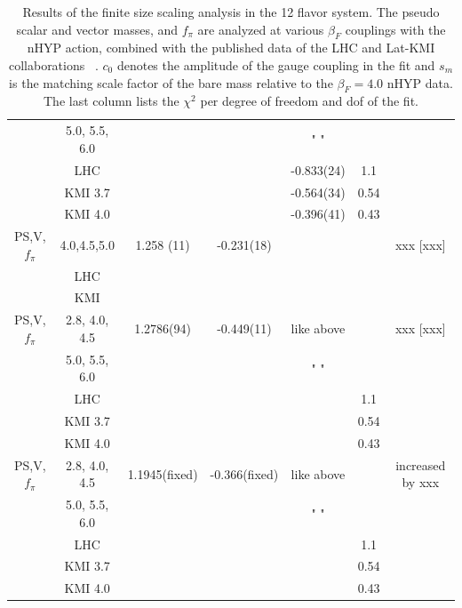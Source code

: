 \documentclass[aps,prl,twocolumn,]{revtex4}  %
\begin{document}
\begin{table}[htdp]
\begin{center}
\begin{tabular}{|c|c|c|c|c|c|c|}
	&	5.0, 5.5, 6.0	& 	        	&	        	&	" "	&		   &		    \\
	&	LHC\protect\cite{Fodor:2011tu}	&	&			    &	-0.833(24)&	1.1 	& 	 \\
	&	KMI 3.7\protect\cite{Aoki:2012eq}	&	&			    &	-0.564(34)	&	0.54 &	 	 \\
	&	KMI 4.0\protect\cite{Aoki:2012eq}	&	&			    &	-0.396(41)	&	0.43 &	\\
\hline
PS,V,$f_\pi$	&	4.0,4.5,5.0	& 1.258 (11)	&	-0.231(18)  	&		&		&	xxx [xxx]	\\
	&	LHC\protect\cite{Fodor:2011tu}	&		&			&		&		&	 \\
	&	KMI\protect\cite{Aoki:2012eq} 	&		&			&		&		&	 \\
\hline	
PS,V,$f_\pi$&	2.8, 4.0, 4.5	& 	1.2786(94)	&	 -0.449(11)	&	like above	&		    &	xxx [xxx] \\
	&	5.0, 5.5, 6.0	& 	        	&	        	&	" "	&		   &		    \\
	&	LHC\protect\cite{Fodor:2011tu}	&	&			    &	&	1.1 	& 	 \\
	&	KMI 3.7\protect\cite{Aoki:2012eq}	&	&			    &		&	0.54 &	 	 \\
	&	KMI 4.0\protect\cite{Aoki:2012eq}	&	&			    &	&	0.43 &	\\
\hline
PS,V,$f_\pi$&	2.8, 4.0, 4.5	& 	1.1945(fixed)	&	 -0.366(fixed)	&	like above	&		    &	increased by xxx \\
	&	5.0, 5.5, 6.0	& 	        	&	        	&	" "	&		   &		    \\
	&	LHC\protect\cite{Fodor:2011tu}	&	&			    &	&	1.1 	& 	 \\
	&	KMI 3.7\protect\cite{Aoki:2012eq}	&	&			    &		&	0.54 &	 	 \\
	&	KMI 4.0\protect\cite{Aoki:2012eq}	&	&			    &	&	0.43 &	\\
\hline
\end{tabular}

\end{center}
 \caption{Results of the finite size scaling analysis in the 12 flavor system. The pseudo scalar and  vector masses, and $f_\pi$ are analyzed at various $\beta_F$ couplings with the nHYP action, combined with the published data of the LHC and Lat-KMI collaborations ~\protect\cite{Fodor:2011tu,Aoki:2012eq}.  
 $c_0$ denotes the amplitude of the gauge coupling in the fit and $s_m$ is the matching scale factor of the bare mass relative to the $\beta_F=4.0$ nHYP data. The last column lists the $\chi^2$ per degree of freedom and dof of the fit.  }


\label{table:results}
\end{table}%
\end{document}
